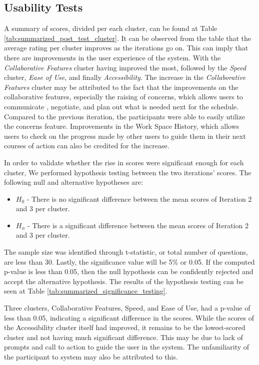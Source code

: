 \subsection{Usability Tests}

A summary of scores, divided per each cluster, can be found at Table \ref{tab:summarized_post_test_cluster}. It can be observed from the table that the average rating per cluster improves as the iterations go on. This can imply that there are improvements in the user experience of the system. With the \textit{Collaborative Features} cluster having improved the most, followed by the \textit{Speed} cluster, \textit{Ease of Use}, and finally \textit{Accessibility}. The increase in the \textit{Collaborative Features} cluster may be attributed to the fact that the improvements on the collaborative features, especially the raising of concerns, which allows users to communicate , negotiate, and plan out what is needed next for the schedule. Compared to the previous iteration, the participants were able to easily utilize the concerns feature. Improvements in the Work Space History, which allows users to check on the progress made by other users to guide them in their next courses of action can also be credited for the increase. 

In order to validate whether the rise in scores were significant enough for each cluster, We performed hypothesis testing between the two iterations' scores. The following null and alternative hypotheses are: 
 \label{list:significance_testing}
 \begin{itemize}
    \item $H_0$ - There is no significant difference between the mean scores of Iteration 2 and 3 per cluster.
    \item $H_\alpha$ - There is a significant difference between the mean scores of Iteration 2 and 3 per cluster.
\end{itemize}

The sample size was identified through t-statistic, or total number of questions, are less than 30. Lastly, the significance value will be 5\% or 0.05. If the computed p-value is less than 0.05, then the null hypothesis can be confidently rejected and accept the alternative hypothesis. The results of the hypothesis testing can be seen at Table \ref{tab:summarized_significance_testing}.

Three clusters, Collaborative Features, Speed, and Ease of Use, had a p-value of less than 0.05, indicating a significant difference in the scores. While the scores of the Accessibility cluster itself had improved, it remains to be the lowest-scored cluster and not having much significant difference. This may be due to lack of prompts and call to action to guide the user in the system. The unfamiliarity of the participant to system may also be attributed to this.

